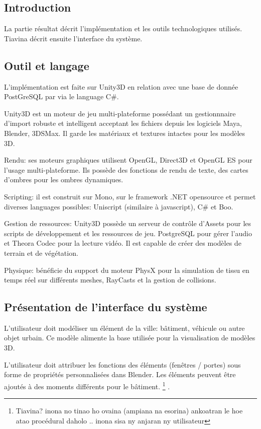 \documentclass[11pt]{report}
\begin{document}
\subsection{Introduction}

La partie résultat décrit l'implémentation et les outils technologiques utilisés. Tiavina décrit ensuite l'interface du système.

\subsection{Outil et langage}

L'implémentation est faite sur Unity3D en relation avec une base de donnée PostGreSQL par via le language C\#.

Unity3D est un moteur de jeu multi-plateforme possédant un gestionnnaire d'import robuste et intelligent acceptant les fichiers depuis les logiciels Maya, Blender, 3DSMax. Il garde les matériaux et textures intactes pour les modèles  3D.

Rendu: ses moteurs graphiques utilisent OpenGL, Direct3D et OpenGL ES pour l'usage multi-plateforme. Ils possède des fonctions de rendu de texte, des cartes d'ombres pour les ombres dynamiques.

Scripting: il est construit sur Mono, sur le framework .NET opensource et permet diverses languages possibles: Uniscript (similaire à javascript), C\# et Boo.

Gestion de ressources: Unity3D possède un serveur de contrôle d'Assets pour les scripts de développement et les ressources de jeu. PostgreSQL pour gérer l'audio et Theora Codec pour la lecture vidéo. Il est capable de créer des modèles de terrain et de végétation.

Physique: bénéficie du support du moteur PhysX pour la simulation de tissu en temps réel sur différents meshes, RayCasts et la gestion de collisions.

\subsection{Présentation de l'interface du système}

L'utilisateur doit modéliser un élément de la ville: bâtiment, véhicule ou autre objet urbain. Ce modèle alimente la base utilisée pour la visualisation de modèles 3D.

L'utilisateur doit attribuer les fonctions des éléments (fenêtres / portes) sous forme de propriétés personnalisées dans Blender.
Les éléments peuvent être ajoutés à des moments différents
pour le bâtiment. \footnote{Tiavina? inona no tinao ho ovaina (ampiana na esorina) ankoatran le hoe atao procédural daholo .. inona sisa ny anjaran ny utilisateur} .
\end{document}

